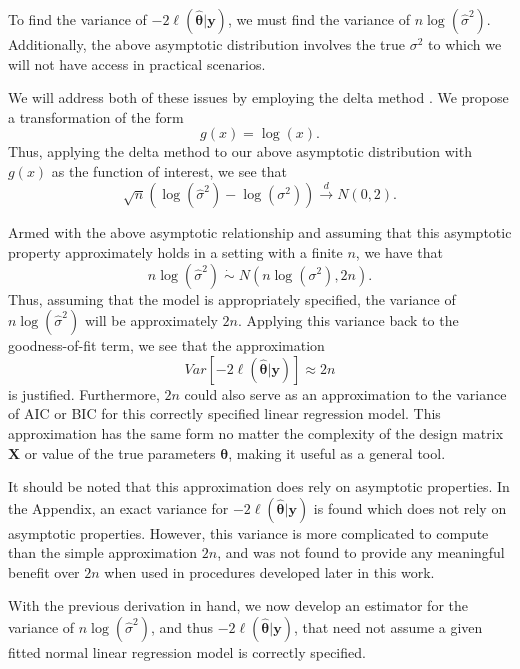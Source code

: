 \documentclass[sn-mathphys-ay]{sn-jnl}
\begin{document}
		To find the variance of $-2 \ell (\hat{\bm{\theta}} | \bm{y}  )$, we must find the variance of $n \log(\hat{\sigma}^2)$.
		Additionally, the above asymptotic distribution involves the true $\sigma^2$ to which we will not have access in practical scenarios.

		We will address both of these issues by employing the delta method \citep{Rao}. We propose a transformation of the form
		\begin{equation*}
			g(x) = \log(x) .
		\end{equation*}
		Thus, applying the delta method to our above asymptotic distribution with $g(x)$ as the function of interest, we see that
		\begin{equation*}
			\sqrt{n} ( \log (\hat{\sigma}^2) - \log(\sigma^2)) \xrightarrow[]{d} N(0, 2) .
		\end{equation*}

		Armed with the above asymptotic relationship and assuming that this asymptotic property approximately holds in a setting with a finite $n$, we have that
		\begin{equation*}
			n\log(\hat{\sigma}^2) \; \dot\sim \; N \left( n\log(\sigma^2), 2n \right) .
		\end{equation*}
		Thus, assuming that the model is appropriately specified, the variance of $n\log(\hat{\sigma}^2)$ will be approximately $2n$. Applying this variance back to the goodness-of-fit term,
		we see that the approximation
		\begin{equation*}
			Var \left[ -2 \ell (\hat{\bm{\theta}} | \bm{y}  ) \right] \approx 2n
		\end{equation*}
		is justified. Furthermore, $2n$ could also serve as an approximation to the variance of AIC or BIC for this correctly specified linear regression model. This approximation
		has the same form no matter the complexity of the design matrix $\bm{X}$ or value of the true parameters $\bm{\theta}$, making it useful as a
		general tool.

		It should be noted that this approximation does rely on asymptotic properties. In the Appendix, an exact variance for $-2 \ell (\hat{\bm{\theta}} | \bm{y})$ is found which does
		not rely on asymptotic properties. However, this variance is more complicated to compute than the simple approximation $2n$, and was not found to provide any meaningful
		benefit over $2n$ when used in procedures developed later in this work.

		With the previous derivation in hand, we now develop an estimator for the variance of $n\log(\hat{\sigma}^2)$, and thus $-2 \ell (\hat{\bm{\theta}} | \bm{y})$,
		that need not assume a given fitted normal linear regression model is correctly specified.
\end{document}
